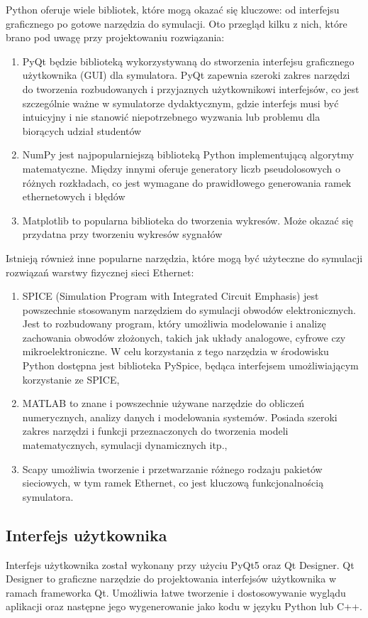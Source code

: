 Python oferuje wiele bibliotek, które mogą okazać się kluczowe: od interfejsu graficznego po gotowe narzędzia do symulacji. Oto przegląd kilku z nich, które brano pod uwagę przy projektowaniu rozwiązania:

\begin{enumerate}
    \item PyQt będzie biblioteką wykorzystywaną do stworzenia interfejsu graficznego użytkownika (GUI) dla symulatora. PyQt zapewnia szeroki zakres narzędzi do tworzenia rozbudowanych i przyjaznych użytkownikowi interfejsów, co jest szczególnie ważne w symulatorze dydaktycznym, gdzie interfejs musi być intuicyjny i nie stanowić niepotrzebnego wyzwania lub problemu dla biorących udział studentów
    \item NumPy jest najpopularniejszą biblioteką Python implementującą algorytmy matematyczne. Między innymi oferuje generatory liczb pseudolosowych o różnych rozkładach, co jest wymagane do prawidłowego generowania ramek ethernetowych i błędów
    \item  Matplotlib to popularna biblioteka do tworzenia wykresów. Może okazać się przydatna przy tworzeniu wykresów sygnałów
\end{enumerate}


Istnieją również inne popularne narzędzia, które mogą być użyteczne do symulacji rozwiązań warstwy fizycznej sieci Ethernet:
\begin{enumerate}
    \item SPICE (Simulation Program with Integrated Circuit Emphasis) jest powszechnie stosowanym narzędziem do symulacji obwodów elektronicznych. Jest to rozbudowany program, który umożliwia modelowanie i analizę zachowania obwodów złożonych, takich jak układy analogowe, cyfrowe czy mikroelektroniczne. W celu korzystania z tego narzędzia w środowisku Python dostępna jest biblioteka PySpice, będąca interfejsem umożliwiającym korzystanie ze SPICE,
    \item MATLAB to znane i powszechnie używane narzędzie do obliczeń numerycznych, analizy danych i modelowania systemów. Posiada szeroki zakres narzędzi i funkcji przeznaczonych do tworzenia modeli matematycznych, symulacji dynamicznych itp.,
    \item Scapy umożliwia tworzenie i przetwarzanie różnego rodzaju pakietów sieciowych, w tym ramek Ethernet, co jest kluczową funkcjonalnością symulatora.
\end{enumerate}

\subsection{Interfejs użytkownika}\label{subsection:interfejs}
Interfejs użytkownika został wykonany przy użyciu PyQt5 oraz Qt Designer. Qt Designer to graficzne narzędzie do projektowania interfejsów użytkownika w ramach frameworka Qt. Umożliwia łatwe tworzenie i dostosowywanie wyglądu aplikacji oraz następne jego wygenerowanie jako kodu w języku Python lub C++.

